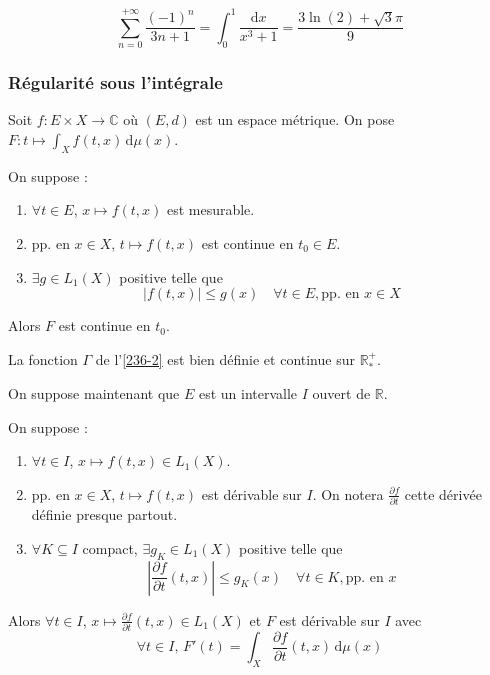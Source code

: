 
  \begin{example}
    \[ \sum_{n=0}^{+\infty} \frac{(-1)^n}{3n+1} = \int_0^1 \frac{\mathrm{d}x}{x^3 + 1} = \frac{3\ln(2) + \sqrt{3}\pi}{9} \]
  \end{example}

  \subsubsection{Régularité sous l'intégrale}


  Soit $f : E \times X \rightarrow \mathbb{C}$ où $(E, d)$ est un espace métrique. On pose $F : t \mapsto \int_X f(t, x) \, \mathrm{d}\mu(x)$.

  \begin{theorem}
    On suppose :
    \begin{enumerate}[label={\bfseries(\roman*)}]
      \item $\forall t \in E$, $x \mapsto f(t,x)$ est mesurable.
      \item pp. en $x \in X$, $t \mapsto f(t,x)$ est continue en $t_0 \in E$.
      \item $\exists g \in L_1(X)$ positive telle que
      \[ |f(t,x)| \leq g(x) \quad \forall t \in E, \text{pp. en } x \in X \]
    \end{enumerate}
    Alors $F$ est continue en $t_0$.
  \end{theorem}


  \begin{example}
    La fonction $\Gamma$ de l'\cref{236-2} est bien définie et continue sur $\mathbb{R}^+_*$.
  \end{example}


  On suppose maintenant que $E$ est un intervalle $I$ ouvert de $\mathbb{R}$.

  \begin{theorem}
    On suppose :
    \begin{enumerate}[label={\bfseries(\roman*)}]
      \item $\forall t \in I$, $x \mapsto f(t,x) \in L_1(X)$.
      \item pp. en $x \in X$, $t \mapsto f(t,x)$ est dérivable sur $I$. On notera $\frac{\partial f}{\partial t}$ cette dérivée définie presque partout.
      \item $\forall K \subseteq I$ compact, $\exists g_K \in L_1(X)$ positive telle que
      \[ \left| \frac{\partial f}{\partial t}(t,x) \right| \leq g_K(x) \quad \forall t \in K, \text{pp. en } x \]
    \end{enumerate}
    Alors $\forall t \in I$, $x \mapsto \frac{\partial f}{\partial t}(t, x) \in L_1(X)$ et $F$ est dérivable sur $I$ avec
    \[ \forall t \in I, \, F'(t) = \int_X \frac{\partial f}{\partial t}(t, x) \, \mathrm{d}\mu(x) \]
  \end{theorem}

